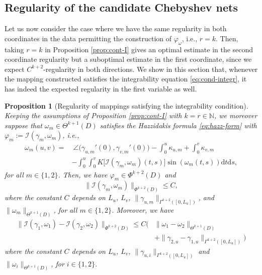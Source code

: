 \documentclass{article}
\newcommand{\I}{\mathcal{I}}
\newcommand{\EN}{\mathbb{N}}
\newcommand{\ko}{\kappa}
\newcommand{\ds}{\mathrm{d}s}
\newcommand{\dt}{\mathrm{d}t}
\newtheorem{proposition}[theorem]{Proposition}
\theoremstyle{remark}
\theoremstyle{prpart}
\begin{document}
\subsection{Regularity of the candidate Chebyshev nets}\label{sec:reg-candidate}
Let us now consider the case where we have the same regularity in both coordinates in the data permitting the construction of $\varphi_\omega$, i.e., $r=k$. Then, taking $r=k$ in Proposition \ref{prop:cont-I} gives an optimal estimate in the second coordinate regularity but a suboptimal estimate in the first coordinate, since we expect $C^{k+2}$-regularity in both directions.
We show in this section that, whenever the mapping constructed satisfies the integrability equation \eqref{eq:cond-integr}, 
it has indeed the expected regularity in the first variable as well.
\begin{proposition}[Regularity of mappings satisfying the integrability condition]\label{prop:reg-cheb}
  Keeping the assumptions of Proposition \ref{prop:cont-I} with $k=r\in\EN$, we moreover suppose that $\omega_m\in\Theta^{k+1}(D)$ satisfies the Hazzidakis formula \eqref{eq:hazz-form} with $\varphi_m:=\I(\gamma_m,\omega_m)$, i.e.,
  \begin{equation}\label{eq:hazz-form-bis}
    \begin{split}
  \omega_m(u,v) = &~\angle\big(\gamma_{u,m}'(0),\gamma_{v,m}'(0)\big) - \int_0^u\ko_{u,m} + \int_{0}^v\ko_{v,m}\\
  & -\int_{0}^{u} \int_{0}^{v} K\big[\I(\gamma_m,\omega_m)(t,s)\big]\sin(\omega_m(t,s)) \dt \ds,
  \end{split}
  \end{equation}
  for all $m\in\{1,2\}$. Then, we have $\varphi_m \in \Phi^{k+2}(D)$ and
\begin{equation}
\label{eq:borne-cheb}
 \|\I(\gamma_m,\omega_m)\|_{\Phi^{k+2}(D)} \leq C,
\end{equation}
where the constant $C$ depends on $L_u$, $L_v$, $\|\gamma_{u,m}\|_{\Gamma^{k+2}([0,L_u])}$, and $\|\omega_m\|_{\Theta^{k+1}(D)}$, for all $m\in\{1,2\}$. Moreover, we have
\begin{equation}\label{eq:reg-cheb}
\begin{split}
\|\I(\gamma_1,\omega_1) - \I(\gamma_2,\omega_2)\|_{\Phi^{k+2}(D)} \leq C\Big(&\|\omega_1 - \omega_2\|_{\Theta^{k+1}(D)} \\
& + \|\gamma_{2,u}-\gamma_{1,u}\|_{\Gamma^{k+2}([0,L_u])}\Big)
\end{split}
\end{equation}
where the constant $C$ depends on $L_u$, $L_v$, $\|\gamma_{u,i}\|_{\Gamma^{k+2}([0,L_u])}$ and $\|\omega_i\|_{\Theta^{k+1}(D)}$, for $i\in\{1,2\}$.
\end{proposition}
\end{document}
